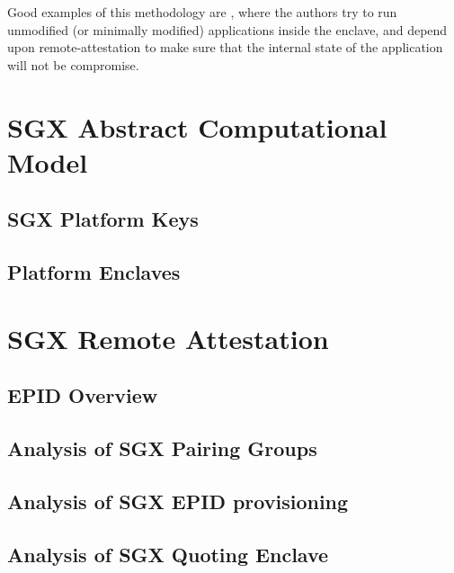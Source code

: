 \documentclass[11pt]{article}
\begin{document}
  Good examples of this methodology are \cite{Haven, Graphene, Scone},
  where the authors try to run unmodified (or minimally modified)
  applications inside the enclave, and depend upon remote-attestation
  to make sure that the internal state of the application will not be
  compromise.


  \section{SGX Abstract Computational Model}

  \subsection{SGX Platform Keys}

  \subsection{Platform Enclaves}

  \section{SGX Remote Attestation}

  \subsection{EPID Overview}
  \subsection{Analysis of SGX Pairing Groups}
  \subsection{Analysis of SGX EPID provisioning}
  \subsection{Analysis of SGX Quoting Enclave}



\end{document}
